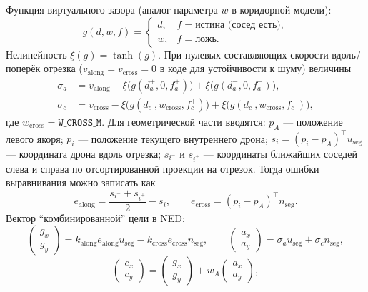 \documentclass[12pt,a4paper]{article}
\begin{document}
Функция виртуального зазора (аналог параметра $w$ в коридорной модели):
\begin{equation}
  g(d, w, f) =
  \begin{cases}
    d, & f = \text{истина (сосед есть)},\\
    w, & f = \text{ложь}.
  \end{cases}
\end{equation}
Нелинейность $\xi(g) = \tanh(g)$. При нулевых составляющих скорости вдоль/поперёк отрезка ($v_{\mathrm{along}} = v_{\mathrm{cross}} = 0$ в коде для устойчивости к шуму) величины
\begin{align}
  \sigma_a &= v_{\mathrm{along}} - \xi\bigl(g(d_a^+, 0, f_a^+)\bigr) + \xi\bigl(g(d_a^-, 0, f_a^-)\bigr), \\
  \sigma_c &= v_{\mathrm{cross}} - \xi\bigl(g(d_c^+, w_{\mathrm{cross}}, f_c^+)\bigr) + \xi\bigl(g(d_c^-, w_{\mathrm{cross}}, f_c^-)\bigr),
\end{align}
где $w_{\mathrm{cross}} = \texttt{W\_CROSS\_M}$. Для геометрической части вводятся: $p_A$ --- положение левого якоря; $p_i$ --- положение текущего внутреннего дрона; $s_i = (p_i - p_A)^\top u_{\mathrm{seg}}$ --- координата дрона вдоль отрезка; $s_{i^-}$ и $s_{i^+}$ --- координаты ближайших соседей слева и справа по отсортированной проекции на отрезок. Тогда ошибки выравнивания можно записать как
\begin{equation}
  e_{\mathrm{along}} = \frac{s_{i^-} + s_{i^+}}{2} - s_i, \qquad
  e_{\mathrm{cross}} = (p_i - p_A)^\top n_{\mathrm{seg}}.
\end{equation}
Вектор ``комбинированной'' цели в NED:
\begin{equation}
  \begin{pmatrix} g_x \\ g_y \end{pmatrix}
  = k_{\mathrm{along}} e_{\mathrm{along}} u_{\mathrm{seg}}
  - k_{\mathrm{cross}} e_{\mathrm{cross}} n_{\mathrm{seg}}, \qquad
  \begin{pmatrix} a_x \\ a_y \end{pmatrix}
  = \sigma_a u_{\mathrm{seg}} + \sigma_c n_{\mathrm{seg}},
\end{equation}
\begin{equation}
  \begin{pmatrix} c_x \\ c_y \end{pmatrix}
  = \begin{pmatrix} g_x \\ g_y \end{pmatrix}
  + w_A \begin{pmatrix} a_x \\ a_y \end{pmatrix},
\end{equation}
\end{document}
